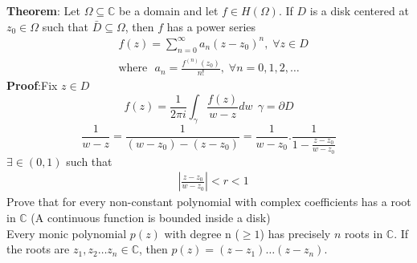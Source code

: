 \documentclass{article}
\begin{document}
\begin{flushleft}
\textbf{Theorem}: Let $\Omega\subseteq \mathds{C}$ be a domain and let $f\in H(\Omega)$. If $D$ is a disk centered at $z_0\in \Omega$ such that $\bar{D}\subseteq \Omega$, then $f$ has a power series\\
\begin{equation*}
    \begin{split}
        &f(z)=\sum_{n=0}^{\infty} a_n(z-z_0)^n\text{,}\:\: \forall z\in D\\
        &\text{where}\:\:\: a_n=\frac{f^{(n)}(z_0)}{n!}\text{,} \:\: \forall n=0,1,2,\dots
    \end{split}
\end{equation*}
\textbf{Proof}:Fix $z\in D$\\
\begin{equation*}
 f(z)=\frac{1}{2\pi i}\int_{\gamma}^{}\frac{f(z)}{w-z} dw \:\: \gamma=\partial D
\end{equation*}
\begin{equation*}
    \frac{1}{w-z}=\frac{1}{(w-z_0)-(z-z_0)}=\frac{1}{w-z_0}.\frac{1}{1-\frac{z-z_0}{w-z_0}}
\end{equation*}
$\exists\in (0,1)$ such that \\
\begin{equation*}
    \begin{split}
        &|\frac{z-z_0}{w-z_0}|<r<1
    \end{split}
\end{equation*}
Prove that for every non-constant polynomial with complex coefficients has a root in $\mathds{C}$ (A continuous function is bounded inside a disk)\\
Every monic polynomial $p(z)$ with degree n ($\geq 1$) has precisely $n$ roots in $\mathds{C}$. If the roots are $z_1,z_2\dots z_n \in \mathds{C}$, then $p(z)= (z-z_1)\dots(z-z_n)$.\\
 

\end{flushleft}
\end{document}
